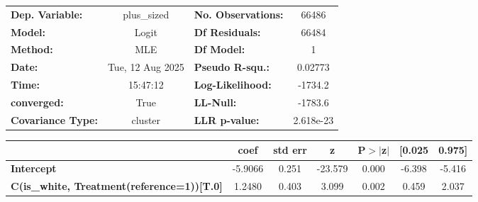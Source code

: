 \begin{center}
\begin{tabular}{lclc}
\toprule
\textbf{Dep. Variable:}                            &   plus\_sized    & \textbf{  No. Observations:  } &    66486    \\
\textbf{Model:}                                    &      Logit       & \textbf{  Df Residuals:      } &    66484    \\
\textbf{Method:}                                   &       MLE        & \textbf{  Df Model:          } &        1    \\
\textbf{Date:}                                     & Tue, 12 Aug 2025 & \textbf{  Pseudo R-squ.:     } &  0.02773    \\
\textbf{Time:}                                     &     15:47:12     & \textbf{  Log-Likelihood:    } &   -1734.2   \\
\textbf{converged:}                                &       True       & \textbf{  LL-Null:           } &   -1783.6   \\
\textbf{Covariance Type:}                          &     cluster      & \textbf{  LLR p-value:       } & 2.618e-23   \\
\bottomrule
\end{tabular}
\begin{tabular}{lcccccc}
                                                   & \textbf{coef} & \textbf{std err} & \textbf{z} & \textbf{P$> |$z$|$} & \textbf{[0.025} & \textbf{0.975]}  \\
\midrule
\textbf{Intercept}                                 &      -5.9066  &        0.251     &   -23.579  &         0.000        &       -6.398    &       -5.416     \\
\textbf{C(is\_white, Treatment(reference=1))[T.0]} &       1.2480  &        0.403     &     3.099  &         0.002        &        0.459    &        2.037     \\
\bottomrule
\end{tabular}
\end{center}